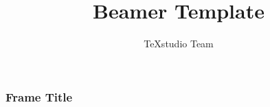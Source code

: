 \documentclass{beamer}
\title{Beamer Template}
\author{TeXstudio Team}
\begin{document}
\begin{frame}[plain]
    \maketitle
\end{frame}
\begin{frame}
\frametitle{Frame Title}
\end{frame}
\end{document}
